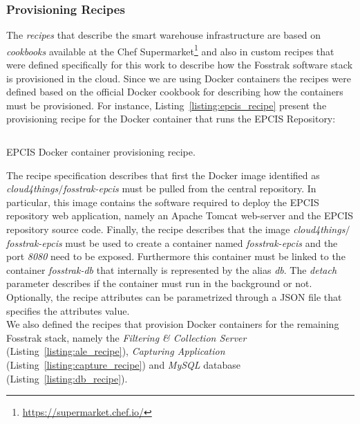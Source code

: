 \subsubsection{Provisioning Recipes}
\label{subs:recipes}
The \textit{recipes} that describe the smart warehouse infrastructure are based on \textit{cookbooks} available at the
Chef Supermarket\footnote{\url{https://supermarket.chef.io/}} and also in custom recipes that
were defined specifically for this work to describe how the Fosstrak software stack is provisioned
in the cloud. Since we are using Docker containers the recipes were defined based on the official
Docker cookbook for describing how the containers must be provisioned. For instance, Listing~\ref{listing:epcis_recipe}
present the provisioning recipe for the Docker container that runs the \gls{EPCIS} Repository:\\

\begin{listing}[ht!]
\inputminted[frame=lines,
             framesep=3mm,
             linenos=true,
             xleftmargin=21pt,
             tabsize=4]{ruby}{./listings/epcis_recipe.rb}
\caption{EPCIS Docker container provisioning recipe.}
\label{listing:epcis_recipe}
\end{listing}

The recipe specification describes that first the Docker image identified as \textit{cloud4things$/$fosstrak-epcis}
must be pulled from the central repository. In particular, this image contains the software required
to deploy the \gls{EPCIS} repository web application, namely an Apache Tomcat web-server and the \gls{EPCIS}
repository source code. Finally, the recipe describes that the image \textit{cloud4things$/$fosstrak-epcis}
must be used to create a container named \textit{fosstrak-epcis} and the port \textit{8080} need to
be exposed. Furthermore this container must be linked to the container \textit{fosstrak-db} that
internally is represented by the alias \textit{db}. The \textit{detach} parameter describes if the
container must run in the background or not. Optionally, the recipe attributes can be parametrized
through a \gls{JSON} file that specifies the attributes value.\\

We also defined the recipes that provision Docker containers for the remaining Fosstrak
stack, namely the \textit{Filtering \& Collection Server} (Listing~\ref{listing:ale_recipe}),
\textit{Capturing Application} (Listing~\ref{listing:capture_recipe}) and \textit{MySQL}
database (Listing~\ref{listing:db_recipe}).

